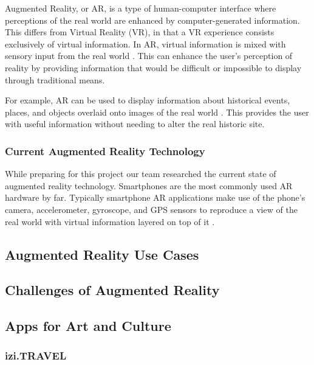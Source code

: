 \documentclass[a4paper, 10pt, american]{article}
\begin{document}
Augmented Reality, or AR, is a type of human-computer interface where
perceptions of the real world are enhanced by computer-generated information.
This differs from Virtual Reality (VR), in that a VR experience consists
exclusively of virtual information. In AR, virtual information is mixed with
sensory input from the real world \autocite{carmigniani2011}. This can enhance
the user's perception of reality by providing information that would be
difficult or impossible to display through traditional means.

For example, AR can be used to display information about historical events,
places, and objects overlaid onto images of the real world
\autocite{saenz2009}.  This provides the user with useful information without
needing to alter the real historic site.

\subsubsection{Current Augmented Reality Technology}
\label{sec:currentAugmentedRealityTechnology}

While preparing for this project our team researched the current state of
augmented reality technology. Smartphones are the most commonly used AR
hardware by far. Typically smartphone AR applications make use of the phone's
camera, accelerometer, gyroscope, and GPS sensors to reproduce a view of the
real world with virtual information layered on top of it
\autocite{bonsor2018}.

\subsection{Augmented Reality Use Cases}
\label{sec:augmentedRealityUseCases}

\lipsum[1]

\subsection{Challenges of Augmented Reality}
\label{sec:challengesOfAugmentedReality}

\lipsum[1]

\subsection{Apps for Art and Culture}
\label{sec:appsForArtAndCulture}

\lipsum[2-3]

\subsubsection{izi.TRAVEL}
\label{sec:iziTravel}
\end{document}
